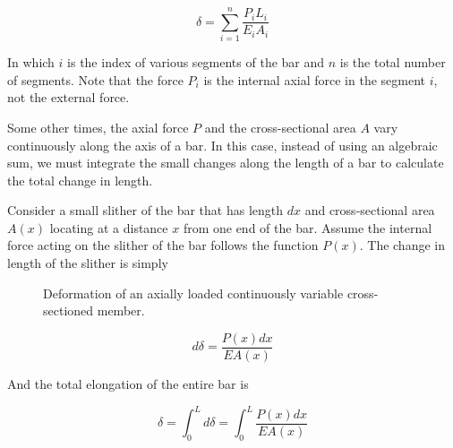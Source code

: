 \documentclass[
10pt,
a4paper,
openany,
svgnames,
]{book}
\begin{document}
\begin{equation}
  \delta  = \sum\limits_{i = 1}^n \frac{P_iL_i}{E_iA_i}
\end{equation}

In which $i$ is the index of various segments of the bar and $n$ is the total number of segments. Note that the force $P_i$ is the internal axial force in the segment $i$, not the external force.

Some other times, the axial force $P$ and the cross-sectional area $A$ vary continuously along the axis of a bar. In this case, instead of using an algebraic sum, we must integrate the small changes along the length of a bar to calculate the total change in length.

Consider a small slither of the bar that has length $dx$ and cross-sectional area $A(x)$ locating at a distance $x$ from one end of the bar. Assume the internal force acting on the slither of the bar follows the function $P(x)$. The change in length of the slither is simply

\begin{figure}[h]
  \centering
  \caption{Deformation of an axially loaded continuously variable cross-sectioned member.}
\end{figure}

  \[d\delta  = \frac{P(x)dx}{EA(x)}\]

And the total elongation of the entire bar is

\begin{equation}
  \delta  = \int_0^L {d\delta }  = \int_0^L \frac{P(x)dx}{EA(x)}
\end{equation}
\end{document}
